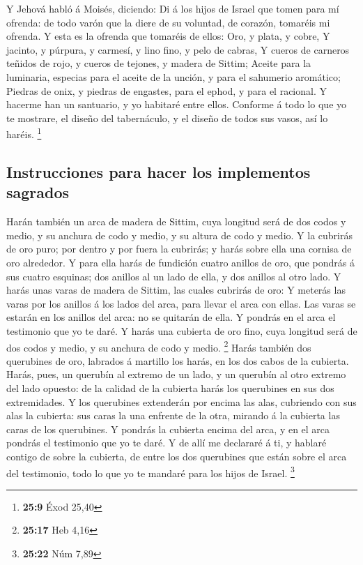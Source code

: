  Y Jehová habló á Moisés, diciendo:  Di á
los hijos de Israel que tomen para mí ofrenda: de todo varón que la
diere de su voluntad, de corazón, tomaréis mi ofrenda.  Y
esta es la ofrenda que tomaréis de ellos: Oro, y plata, y cobre,
 Y jacinto, y púrpura, y carmesí, y lino fino, y pelo de
cabras,  Y cueros de carneros teñidos de rojo, y cueros de
tejones, y madera de Sittim;  Aceite para la luminaria,
especias para el aceite de la unción, y para el sahumerio aromático;
 Piedras de onix, y piedras de engastes, para el ephod, y
para el racional.  Y hacerme han un santuario, y yo
habitaré entre ellos.  Conforme á todo lo que yo te
mostrare, el diseño del tabernáculo, y el diseño de todos sus vasos, así
lo haréis. \footnote{\textbf{25:9} Éxod 25,40}

\hypertarget{instrucciones-para-hacer-los-implementos-sagrados}{%
\subsection{Instrucciones para hacer los implementos
sagrados}\label{instrucciones-para-hacer-los-implementos-sagrados}}

 Harán también un arca de madera de Sittim, cuya longitud
será de dos codos y medio, y su anchura de codo y medio, y su altura de
codo y medio.  Y la cubrirás de oro puro; por dentro y
por fuera la cubrirás; y harás sobre ella una cornisa de oro alrededor.
 Y para ella harás de fundición cuatro anillos de oro,
que pondrás á sus cuatro esquinas; dos anillos al un lado de ella, y dos
anillos al otro lado.  Y harás unas varas de madera de
Sittim, las cuales cubrirás de oro:  Y meterás las varas
por los anillos á los lados del arca, para llevar el arca con ellas.
 Las varas se estarán en los anillos del arca: no se
quitarán de ella.  Y pondrás en el arca el testimonio que
yo te daré.  Y harás una cubierta de oro fino, cuya
longitud será de dos codos y medio, y su anchura de codo y medio.
\footnote{\textbf{25:17} Heb 4,16}  Harás también dos
querubines de oro, labrados á martillo los harás, en los dos cabos de la
cubierta.  Harás, pues, un querubín al extremo de un
lado, y un querubín al otro extremo del lado opuesto: de la calidad de
la cubierta harás los querubines en sus dos extremidades.
 Y los querubines extenderán por encima las alas,
cubriendo con sus alas la cubierta: sus caras la una enfrente de la
otra, mirando á la cubierta las caras de los querubines. 
Y pondrás la cubierta encima del arca, y en el arca pondrás el
testimonio que yo te daré.  Y de allí me declararé á ti,
y hablaré contigo de sobre la cubierta, de entre los dos querubines que
están sobre el arca del testimonio, todo lo que yo te mandaré para los
hijos de Israel. \footnote{\textbf{25:22} Núm 7,89}

